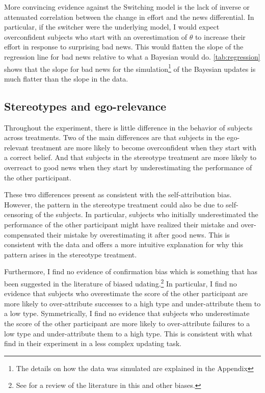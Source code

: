 \documentclass[
  12pt,
]{article}
\begin{document}
More convincing evidence against the Switching model is the lack of
inverse or attenuated correlation between the change in effort and the
news differential. In particular, if the switcher were the underlying
model, I would expect overconfident subjects who start with an
overestimation of \(\theta\) to increase their effort in response to
surprising bad news. This would flatten the slope of the regression line
for bad news relative to what a Bayesian would do. \ref{tab:regression}
shows that the slope for bad news for the
simulation\footnote{The details on how the data was simulated are explained in the Appendix}
of the Bayesian updates is much flatter than the slope in the data.

\hypertarget{stereotypes-and-ego-relevance}{%
\subsection{Stereotypes and
ego-relevance}\label{stereotypes-and-ego-relevance}}

Throughout the experiment, there is little difference in the behavior of
subjects across treatments. Two of the main differences are that
subjects in the ego-relevant treatment are more likely to become
overconfident when they start with a correct belief. And that subjects
in the stereotype treatment are more likely to overreact to good news
when they start by underestimating the performance of the other
participant.

These two differences present as consistent with the self-attribution
bias. However, the pattern in the stereotype treatment could also be due
to self-censoring of the subjects. In particular, subjects who initially
underestimated the performance of the other participant might have
realized their mistake and over-compensated their mistake by
overestimating it after good news. This is consistent with the data and
offers a more intuitive explanation for why this pattern arises in the
stereotype treatment.

Furthermore, I find no evidence of confirmation bias which is something
that has been suggested in the literature of biased
udating.\footnote{See \citet{benjamin2019} for a review of the literature in this and 
other biases.} In particular, I find no evidence that subjects who
overestimate the score of the other participant are more likely to
over-attribute successes to a high type and under-attribute them to a
low type. Symmetrically, I find no evidence that subjects who
underestimate the score of the other participant are more likely to
over-attribute failures to a low type and under-attribute them to a high
type. This is consistent with what \citet{Mobius2022} find in their
experiment in a less complex updating task.
\end{document}
